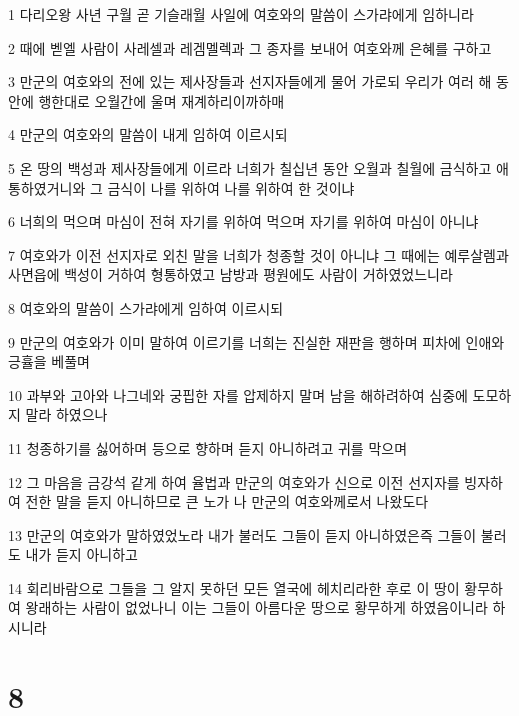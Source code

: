 \par 1 다리오왕 사년 구월 곧 기슬래월 사일에 여호와의 말씀이 스가랴에게 임하니라
\par 2 때에 벧엘 사람이 사레셀과 레겜멜렉과 그 종자를 보내어 여호와께 은혜를 구하고
\par 3 만군의 여호와의 전에 있는 제사장들과 선지자들에게 물어 가로되 우리가 여러 해 동안에 행한대로 오월간에 울며 재계하리이까하매
\par 4 만군의 여호와의 말씀이 내게 임하여 이르시되
\par 5 온 땅의 백성과 제사장들에게 이르라 너희가 칠십년 동안 오월과 칠월에 금식하고 애통하였거니와 그 금식이 나를 위하여 나를 위하여 한 것이냐
\par 6 너희의 먹으며 마심이 전혀 자기를 위하여 먹으며 자기를 위하여 마심이 아니냐
\par 7 여호와가 이전 선지자로 외친 말을 너희가 청종할 것이 아니냐 그 때에는 예루살렘과 사면읍에 백성이 거하여 형통하였고 남방과 평원에도 사람이 거하였었느니라
\par 8 여호와의 말씀이 스가랴에게 임하여 이르시되
\par 9 만군의 여호와가 이미 말하여 이르기를 너희는 진실한 재판을 행하며 피차에 인애와 긍휼을 베풀며
\par 10 과부와 고아와 나그네와 궁핍한 자를 압제하지 말며 남을 해하려하여 심중에 도모하지 말라 하였으나
\par 11 청종하기를 싫어하며 등으로 향하며 듣지 아니하려고 귀를 막으며
\par 12 그 마음을 금강석 같게 하여 율법과 만군의 여호와가 신으로 이전 선지자를 빙자하여 전한 말을 듣지 아니하므로 큰 노가 나 만군의 여호와께로서 나왔도다
\par 13 만군의 여호와가 말하였었노라 내가 불러도 그들이 듣지 아니하였은즉 그들이 불러도 내가 듣지 아니하고
\par 14 회리바람으로 그들을 그 알지 못하던 모든 열국에 헤치리라한 후로 이 땅이 황무하여 왕래하는 사람이 없었나니 이는 그들이 아름다운 땅으로 황무하게 하였음이니라 하시니라

\chapter{8}

